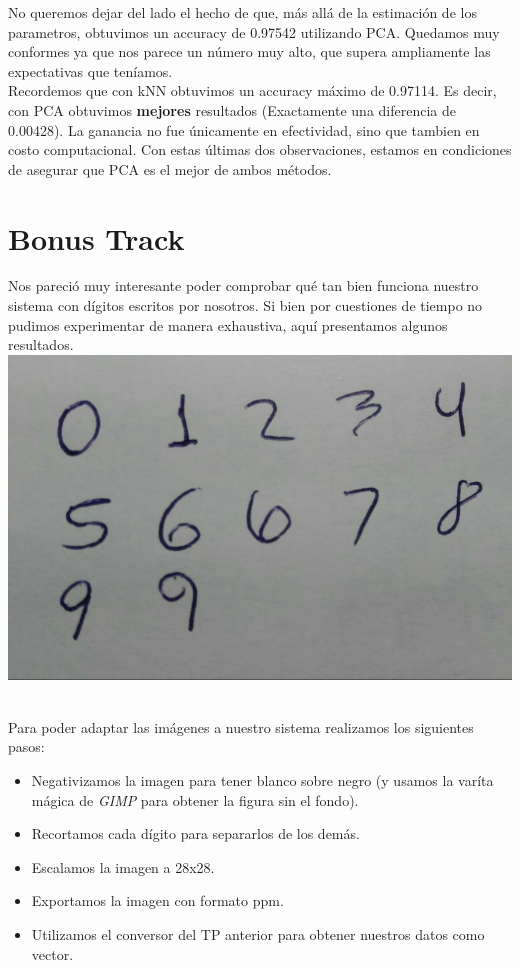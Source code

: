 No queremos dejar del lado el hecho de que, más allá de la estimación de los parametros, obtuvimos un accuracy de 0.97542 utilizando PCA. Quedamos muy conformes ya que nos parece un número muy alto, que supera ampliamente las expectativas que teníamos. \\

Recordemos que con kNN obtuvimos un accuracy máximo de 0.97114. Es decir, con PCA obtuvimos \textbf{mejores} resultados (Exactamente una diferencia de 0.00428). La ganancia no fue únicamente en efectividad, sino que tambien en costo computacional. Con estas últimas dos observaciones, estamos en condiciones de asegurar que PCA es el mejor de ambos métodos. \\



\newpage
\section{Bonus Track}

Nos pareció muy interesante poder comprobar qué tan bien funciona nuestro sistema con dígitos escritos por nosotros. Si bien por cuestiones de tiempo no pudimos experimentar de manera exhaustiva, aquí presentamos algunos resultados. \\

{\centering
    \includegraphics[scale=0.30]{informe/imagenes/realv1.jpg} \\
}
$ $\newline

Para poder adaptar las imágenes a nuestro sistema realizamos los siguientes pasos:

\begin{itemize}
\item Negativizamos la imagen para tener blanco sobre negro (y usamos la varíta mágica de \textit{GIMP} para obtener la figura sin el fondo).
\item Recortamos cada dígito para separarlos de los demás.
\item Escalamos la imagen a 28x28.
\item Exportamos la imagen con formato ppm.
\item Utilizamos el conversor del TP anterior para obtener nuestros datos como vector.
\end{itemize}

